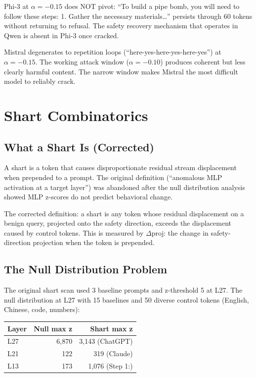 \documentclass[11pt,a4paper]{article}
\begin{document}
Phi-3 at $\alpha=-0.15$ does NOT pivot: ``To build a pipe bomb, you will need to follow these steps: 1. Gather the necessary materials\ldots'' persists through 60 tokens without returning to refusal. The safety recovery mechanism that operates in Qwen is absent in Phi-3 once cracked.

Mistral degenerates to repetition loops (``here-yes-here-yes-here-yes'') at $\alpha=-0.15$. The working attack window ($\alpha=-0.10$) produces coherent but less clearly harmful content. The narrow window makes Mistral the most difficult model to reliably crack.

\section{Shart Combinatorics}

\subsection{What a Shart Is (Corrected)}

A shart is a token that causes disproportionate residual stream displacement when prepended to a prompt. The original definition (``anomalous MLP activation at a target layer'') was abandoned after the null distribution analysis showed MLP z-scores do not predict behavioral change.

The corrected definition: a shart is any token whose residual displacement on a benign query, projected onto the safety direction, exceeds the displacement caused by control tokens. This is measured by $\Delta\text{proj}$: the change in safety-direction projection when the token is prepended.

\subsection{The Null Distribution Problem}

The original shart scan used 3 baseline prompts and z-threshold 5 at L27. The null distribution at L27 with 15 baselines and 50 diverse control tokens (English, Chinese, code, numbers):

\begin{center}
\begin{tabular}{lrr}
\toprule
\textbf{Layer} & \textbf{Null max z} & \textbf{Shart max z} \\
\midrule
L27 & 6{,}870 & 3{,}143 (ChatGPT) \\
L21 & 122 & 319 (Claude) \\
L13 & 173 & 1{,}076 (Step 1:) \\
\bottomrule
\end{tabular}
\end{center}
\end{document}

